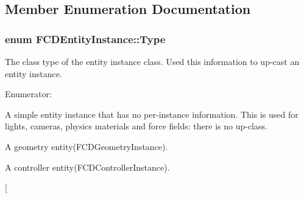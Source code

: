 \subsection{Member Enumeration Documentation}
\hypertarget{classFCDEntityInstance_a82e95eec7d9242bbedb336b0d35b59d3}{
\subsubsection[{Type}]{\setlength{\rightskip}{0pt plus 5cm}enum {\bf FCDEntityInstance::Type}}}
\label{classFCDEntityInstance_a82e95eec7d9242bbedb336b0d35b59d3}
The class type of the entity instance class. Used this information to up-\/cast an entity instance. \begin{Desc}
\item[Enumerator: ]\par
\begin{description}
\item[{\em 
\hypertarget{classFCDEntityInstance_a82e95eec7d9242bbedb336b0d35b59d3aa31de3dc363bacacbbf12a8f9d760477}{
SIMPLE}
\label{classFCDEntityInstance_a82e95eec7d9242bbedb336b0d35b59d3aa31de3dc363bacacbbf12a8f9d760477}
}]A simple entity instance that has no per-\/instance information. This is used for lights, cameras, physics materials and force fields: there is no up-\/class. \item[{\em 
\hypertarget{classFCDEntityInstance_a82e95eec7d9242bbedb336b0d35b59d3a6026b8777b8988f942f78b8172c1604d}{
GEOMETRY}
\label{classFCDEntityInstance_a82e95eec7d9242bbedb336b0d35b59d3a6026b8777b8988f942f78b8172c1604d}
}]A geometry entity(FCDGeometryInstance). \item[{\em 
\hypertarget{classFCDEntityInstance_a82e95eec7d9242bbedb336b0d35b59d3a96bbf48e06e48db7a862619342469762}{
CONTROLLER}
\label{classFCDEntityInstance_a82e95eec7d9242bbedb336b0d35b59d3a96bbf48e06e48db7a862619342469762}
}]A controller entity(FCDControllerInstance). \item[{\em 
}
\end{description}
\end{Desc}
